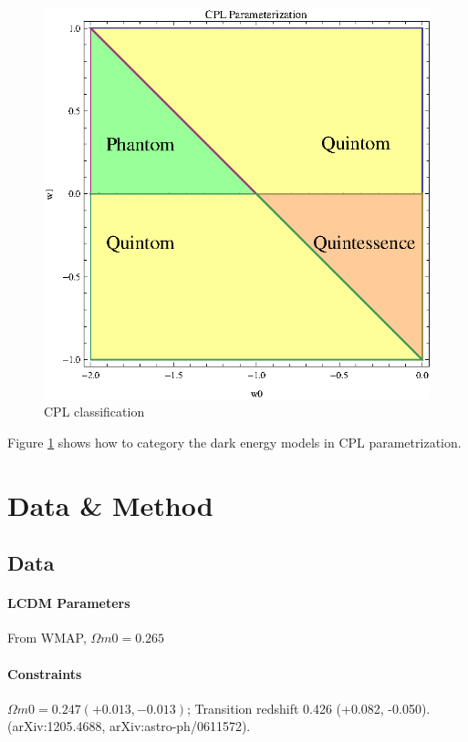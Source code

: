 \documentclass[12pt,a4paper]{article}
\begin{document}
\begin{figure}[htpb]
\centering
\includegraphics[width=400pt]{CPL_Classification.eps}
\caption{CPL classification}\label{fig-CPL_Classification}
\end{figure}

Figure \ref{fig-CPL_Classification} shows how to category the dark energy models in CPL parametrization.


\section{Data \& Method}

\subsection{Data}

\paragraph{LCDM Parameters}
From WMAP, $\Omega m0 = 0.265$

\paragraph{Constraints}
$\Omega m0=0.247 (+0.013,-0.013)$; Transition redshift 0.426 (+0.082, -0.050).(arXiv:1205.4688, arXiv:astro-ph/0611572).
\end{document}
